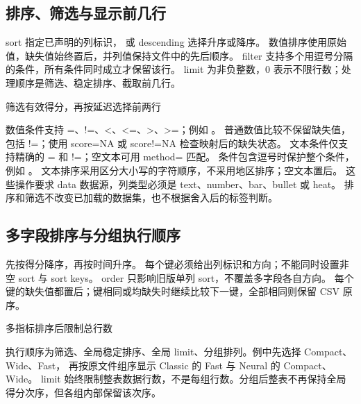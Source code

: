\subsection{排序、筛选与显示前几行}
sort 指定已声明的列标识， 或 descending 选择升序或降序。
数值排序使用原始值，缺失值始终置后，并列值保持文件中的先后顺序。
filter 支持多个用逗号分隔的条件，所有条件同时成立才保留该行。
limit 为非负整数，0 表示不限行数；处理顺序是筛选、稳定排序、截取前几行。
\begin{example}[text and listing,sidebyside=false]{筛选有效得分，再按延迟选择前两行}
\begin{center}
\begin{gradtable}[align=c,header align=c,data=results,width=\linewidth,scale=column,
  filter={score>=75},sort=time,order=ascending,limit=2]
\end{gradtable}
\end{center}
\end{example}
数值条件支持 =、!=、<、<=、>、>=；例如 。
普通数值比较不保留缺失值，包括 !=；使用 score=NA 或 score!=NA 检查映射后的缺失状态。
文本条件仅支持精确的 = 和 !=；空文本可用 method= 匹配。
条件包含逗号时保护整个条件，例如 。
文本排序采用区分大小写的字符顺序，不采用地区排序；空文本置后。
这些操作要求 data 数据源，列类型必须是 text、number、bar、bullet 或 heat。
排序和筛选不改变已加载的数据集，也不根据舍入后的标签判断。

\subsection{多字段排序与分组执行顺序}
 先按得分降序，再按时间升序。
每个键必须给出列标识和方向；不能同时设置非空 sort 与 sort keys。
order 只影响旧版单列 sort，不覆盖多字段各自方向。
每个键的缺失值都置后；键相同或均缺失时继续比较下一键，全部相同则保留 CSV 原序。
\begin{example}[text and listing,sidebyside=false]{多指标排序后限制总行数}
\begin{center}
\begin{gradtable}[align=c,header align=c,data=families,width=\linewidth,
  sort keys={score/descending,time/ascending},limit=3,group by=family]
\end{gradtable}
\end{center}
\end{example}
执行顺序为筛选、全局稳定排序、全局 limit、分组排列。例中先选择 Compact、Wide、Fast，
再按原文件组序显示 Classic 的 Fast 与 Neural 的 Compact、Wide。
limit 始终限制整表数据行数，不是每组行数。分组后整表不再保持全局得分次序，但各组内部保留该次序。

